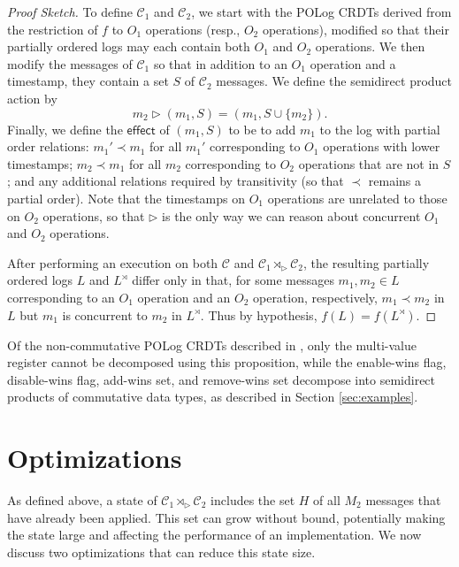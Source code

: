 \documentclass[acmsmall,nonacm]{acmart}
\newcommand{\mc}[1]{\ensuremath{\mathcal{#1}}}
\newcommand{\msf}[1]{\ensuremath{\mathsf{#1}}}
\newcommand{\act}{\triangleright}
\theoremstyle{plain}
\theoremstyle{definition}
\begin{document}
\begin{proof}[Proof Sketch]
To define $\mc{C}_1$ and $\mc{C}_2$, we start with the POLog CRDTs derived from the restriction of $f$ to $O_1$ operations (resp., $O_2$ operations), modified so that their partially ordered logs may each contain both $O_1$ and $O_2$ operations.  We then modify the messages of $\mc{C}_1$ so that in addition to an $O_1$ operation and a timestamp, they contain a set $S$ of $\mc{C}_2$ messages.  We define the semidirect product action by
\[
m_2 \act (m_1, S) = (m_1, S \cup \{m_2\}).
\]
Finally, we define the $\msf{effect}$ of $(m_1, S)$ to be to add $m_1$ to the log with partial order relations: $m_1' \prec m_1$ for all $m_1'$ corresponding to $O_1$ operations with lower timestamps; $m_2 \prec m_1$ for all $m_2$ corresponding to $O_2$ operations that are not in $S$; and any additional relations required by transitivity (so that $\prec$ remains a partial order).  Note that the timestamps on $O_1$ operations are unrelated to those on $O_2$ operations, so that $\act$ is the only way we can reason about concurrent $O_1$ and $O_2$ operations.

After performing an execution on both $\mc{C}$ and $\mc{C}_1 \rtimes_\act \mc{C}_2$, the resulting partially ordered logs $L$ and $L^\rtimes$ differ only in that, for some messages $m_1, m_2 \in L$ corresponding to an $O_1$ operation and an $O_2$ operation, respectively, $m_1 \prec m_2$ in $L$ but $m_1$ is concurrent to $m_2$ in $L^\rtimes$.  Thus by hypothesis, $f(L) = f(L^\rtimes)$.
\end{proof}

Of the non-commutative POLog CRDTs described in \cite{pure_op_based_crdts_extended}, only the multi-value register cannot be decomposed using this proposition, while the enable-wins flag, disable-wins flag, add-wins set, and remove-wins set decompose into semidirect products of commutative data types, as described in Section \ref{sec:examples}.





\section{Optimizations}
\label{sec:optimizations}
As defined above, a state of $\mc{C}_1 \rtimes_\act \mc{C}_2$ includes the set $H$ of all $M_2$ messages that have already been applied.  This set can grow without bound, potentially making the state large and affecting the performance of an implementation.  We now discuss two optimizations that can reduce this state size.
\end{document}

